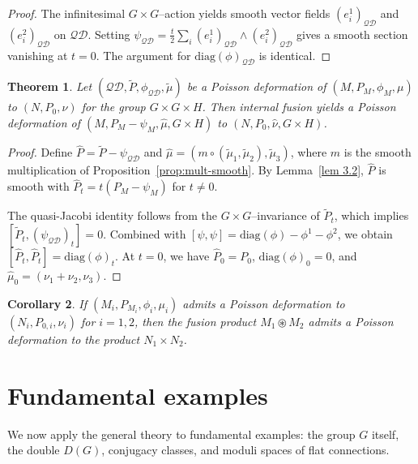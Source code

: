 \documentclass[reqno]{amsart}
\theoremstyle{plain}
\newtheorem{Thm}{Theorem}[section]
\newtheorem{Cor}[Thm]{Corollary}
\theoremstyle{definition}
\begin{document}
\begin{proof}
The infinitesimal $G\times G$--action yields smooth vector fields $(e_{i}^{1})_{\mathcal{QD}}$ and $(e_{i}^{2})_{\mathcal{QD}}$ on $\mathcal{QD}$. Setting $\psi_{\mathcal{QD}}=\frac{t}{2}\sum_{i}(e_{i}^{1})_{\mathcal{QD}}\wedge(e_{i}^{2})_{\mathcal{QD}}$ gives a smooth section vanishing at $t=0$. The argument for $\mathrm{diag}(\phi)_{\mathcal{QD}}$ is identical.
\end{proof}

\begin{Thm}\label{thm:fusion-compat}
Let $(\mathcal{QD},\tilde{P},\phi_{\mathcal{QD}},\tilde{\mu})$ be a Poisson deformation of $(M,P_{M},\phi_{M},\mu)$ to $(N,P_{0},\nu)$ for the group $G\times G\times H$. Then internal fusion yields a Poisson deformation of $(M,P_{M}-\psi_{M},\widehat{\mu},G\times H)$ to $(N,P_{0},\widehat{\nu},G\times H)$.
\end{Thm}

\begin{proof}
Define $\widehat{P}=\tilde{P}-\psi_{\mathcal{QD}}$ and $\widehat{\mu}=(m\circ(\tilde{\mu}_{1},\tilde{\mu}_{2}),\tilde{\mu}_{3})$, where $m$ is the smooth multiplication of Proposition~\ref{prop:mult-smooth}. By Lemma~\ref{lem 3.2}, $\widehat{P}$ is smooth with $\widehat{P}_{t}=t(P_{M}-\psi_{M})$ for $t\neq 0$.

The quasi-Jacobi identity follows from the $G\times G$--invariance of $\tilde{P}_{t}$, which implies $[\tilde{P}_{t},(\psi_{\mathcal{QD}})_{t}]=0$. Combined with $[\psi,\psi]=\mathrm{diag}(\phi)-\phi^{1}-\phi^{2}$, we obtain $[\widehat{P}_{t},\widehat{P}_{t}]=\mathrm{diag}(\phi)_{t}$. At $t=0$, we have $\widehat{P}_{0}=P_{0}$, $\mathrm{diag}(\phi)_{0}=0$, and $\widehat{\mu}_{0}=(\nu_{1}+\nu_{2},\nu_{3})$.
\end{proof}

\begin{Cor}\label{cor:fusion-product}
If $(M_{i},P_{M_{i}},\phi_{i},\mu_{i})$ admits a Poisson deformation to $(N_{i},P_{0,i},\nu_{i})$ for $i=1,2$, then the fusion product $M_{1}\circledast M_{2}$ admits a Poisson deformation to the product $N_{1}\times N_{2}$.
\end{Cor}


\section{Fundamental examples} \label{sec 4}

We now apply the general theory to fundamental examples: the group $G$ itself, the double $D(G)$, conjugacy classes, and moduli spaces of flat connections.
\end{document}
